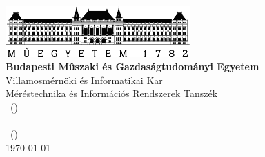 
\begin{titlepage}

\begin{center}
\includegraphics[width=200pt,keepaspectratio]{figures/BMElogo.png}\\
\vspace{0.3cm}
\textbf{Budapesti Mûszaki és Gazdaságtudományi Egyetem}\\
\textmd{Villamosmérnöki és Informatikai Kar}\\
\textmd{Méréstechnika és Információs Rendszerek Tanszék}\\
\textmd{\course \ (\coursecode)}\\[5cm]

{\huge \bfseries \hwtitle}\\[0.8cm]
\vspace{0.5cm}
\textsc{\Large \authorname \ (\authorneptun)}\\[4cm]

\vspace{4cm}
\textsc{\Large \today}\\


\end{center}

\end{titlepage}


